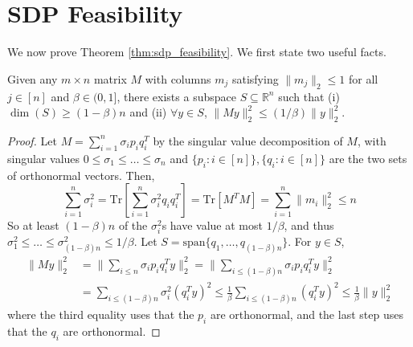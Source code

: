 

\section{SDP Feasibility}
\label{subsec:sdp_feasibility}
We now prove Theorem \ref{thm:sdp_feasibility}. We first state two useful facts.


\begin{lemma}
\label{col1matr}
Given any $m\times n$ matrix $M$ with columns $m_j$ satisfying $\|m_j\|_2\le 1$ for all $j\in[n]$ and $\beta\in(0,1]$, there exists a subspace $S \subseteq \mathbb{R}^n$ such that (i) $\dim(S)\ge (1-\beta)n $ and (ii) $\forall y\in S$, $\|My\|_2^2 \le (1/\beta)\|y\|_2^2$.
\end{lemma}
\begin{proof}
Let $M=\sum_{i=1}^n \sigma_i p_i q_i^T$ by the singular value decomposition of $M$, with singular values $0\le \sigma_1\le\dots\le\sigma_n$ and $\{p_i : i\in [n]\}, \{q_i : i\in [n]\}$ are the two sets of orthonormal  vectors.
Then,
\[
\sum_{i=1}^n\sigma_i^2 =\textrm{Tr}[\sum_{i=1}^n \sigma_i^2 q_iq_i^T]=\textrm{Tr}[M^TM]=\sum_{i=1}^n \|m_i\|_2^2 \le n
\]
So at least $(1-\beta)n$ of the $\sigma_i^2$s have value at most $1/\beta$, and thus $\sigma_1^2\le\dots\le\sigma^2_{(1-\beta)n} \le 1/\beta$.
Let $S=\textrm{span}\{q_1,\dots,q_{(1-\beta)n}\}$. For $y\in S$,
\begin{align*}
\|My\|_2^2 & =  \|\sum_{i\leq n} \sigma_ip_iq_i^T y\|_2^2 
  =   \|\sum_{i \leq (1-\beta)n} \sigma_ip_iq_i^T y\|_2^2 \nonumber\\
 & =  \sum_{i\leq (1-\beta)n} \sigma_i^2 (q_i^Ty)^2  \leq    \frac{1}{\beta}\sum_{i\leq (1-\beta)n}(q_i^Ty)^2 \le \frac{1}{\beta}\|y\|_2^2
\end{align*}
where the third equality uses that the $p_i$ are orthonormal, and the last step uses that the $q_i$ are orthonormal.
\end{proof}


